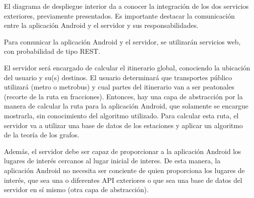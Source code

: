 El diagrama de despliegue interior da a conocer la integraci\'on de los dos servicios exteriores,  previamente presentados. Es importante destacar la comunicaci\'on entre la aplicaci\'on Android y el servidor y sus responsabilidades.
\newline

Para comunicar la aplicaci\'on Android y el servidor, se utilizar\'an servicios web, con probabilidad de tipo REST.
\newline

El servidor ser\'a encargado de calcular el itinerario global, conociendo la ubicaci\'on del usuario y su(s) destinos. El usuario determinar\'a que transportes p\'ublico utilizar\'a (metro o metrobus) y cual partes del itinerario van a ser peatonales (recorte de la ruta en fracciones). 
Entonces, hay una capa de abstracci\'on por la manera de calcular la ruta para la aplicaci\'on Android, que solamente se encargue mostrarla, sin conocimiento del algoritmo utilizado. Para calcular esta ruta, el servidor va a utilizar una base de datos de los estaciones y aplicar un algoritmo de la teor\'ia de los grafos.
\newline

Adem\'as, el servidor debe ser capaz de proporcionar a la aplicaci\'on Android los lugares de inter\'es cercanos al lugar inicial de interes. De esta manera, la aplicaci\'on Android no necesita ser conciente de quien proporciona los lugares de inter\'es, que sea una o diferentes API exteriores o que sea una base de datos del servidor en s\'i mismo (otra capa de abstracci\'on).
